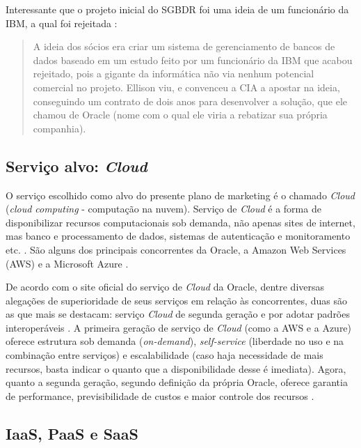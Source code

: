 \documentclass[a4paper]{article}
\newcommand{\C}{\emph{Cloud }}
\begin{document}
Interessante que o projeto inicial do SGBDR foi uma ideia de um funcionário da IBM, a qual foi rejeitada \cite{DonodaOr98:online}:
\begin{quotation}
A ideia dos sócios era criar um sistema de gerenciamento de bancos de dados baseado em um estudo feito por um funcionário da IBM que acabou rejeitado, pois a gigante da informática não via nenhum potencial comercial no projeto. Ellison viu, e convenceu a CIA a apostar na ideia, conseguindo um contrato de dois anos para desenvolver a solução, que ele chamou de Oracle (nome com o qual ele viria a rebatizar sua própria companhia).
\end{quotation}



\subsection{Serviço alvo: \C}

O serviço escolhido como alvo do presente plano de marketing é o chamado \C  (\emph{cloud computing} - computação na nuvem). Serviço de \C é a forma de disponibilizar recursos computacionais sob demanda, não apenas sites de internet, mas banco e processamento de dados, sistemas de autenticação e monitoramento etc. \cite{Computa60:online}. São alguns dos principais concorrentes da Oracle, a Amazon Web Services (AWS) \cite{AmazonWe34:online} e a Microsoft Azure \cite{Microsoft12:online}. 

De acordo com o site oficial do serviço de \C da Oracle, dentre diversas alegações de superioridade de seus serviços em relação às concorrentes, duas são as que mais se destacam: serviço \C de segunda geração e por adotar padrões interoperáveis \cite{CloudInf85:online}. A primeira geração de serviço de \C (como a AWS e a Azure) oferece estrutura sob demanda (\emph{on-demand}), \emph{self-service} (liberdade no uso e na combinação entre serviços) e escalabilidade (caso haja necessidade de mais recursos, basta indicar o quanto que a disponibilidade desse é imediata). Agora, quanto a segunda geração, segundo definição da própria Oracle, oferece garantia de performance, previsibilidade de custos e maior controle dos recursos \cite{1WhytheW34:online}. 

\subsection{IaaS, PaaS e SaaS}
\end{document}
